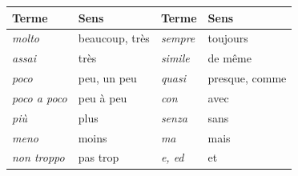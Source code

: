 \begin{tabular}{@{}l l l l@{}}
\toprule
\textbf{Terme} & \textbf{Sens} & \textbf{Terme} & \textbf{Sens} \\
\midrule
\emph{molto} & beaucoup, très & \emph{sempre} & toujours \\
\emph{assai} & très & \emph{simile} & de même \\
\emph{poco} & peu, un peu & \emph{quasi} & presque, comme \\
\emph{poco a poco} & peu à peu & \emph{con} & avec \\
\emph{più} & plus & \emph{senza} & sans \\
\emph{meno} & moins & \emph{ma} & mais \\
\emph{non troppo} & pas trop & \emph{e, ed} & et \\
\bottomrule
\end{tabular}

